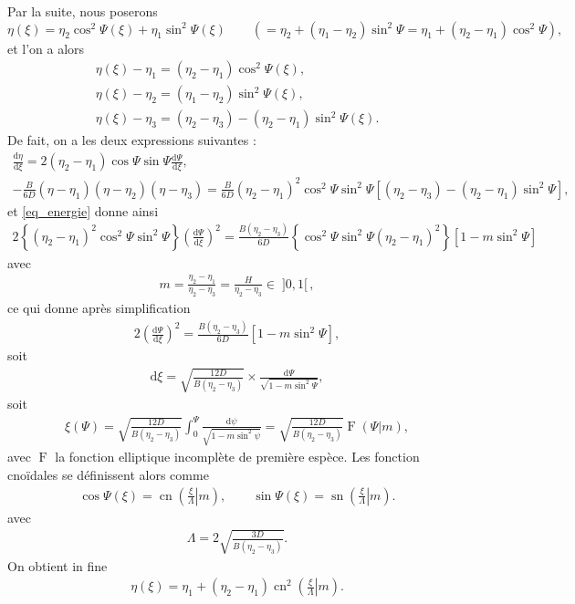 \documentclass[10pt,a4paper, oneside, fleqn]{myarticle}
\newcommand{\dd}{\mathrm{d}}
\DeclareMathOperator{\ellipF}{F}
\DeclareMathOperator{\cn}{cn}
\DeclareMathOperator{\sn}{sn}
\newcommand{\cnoidal}[2]{\cn\left(\left. #1\right\vert #2\right)}
\newcommand{\snoidal}[2]{\sn\left(\left. #1\right\vert #2\right)}
\begin{document}

Par la suite, nous poserons 
\begin{equation}
  \eta(\xi) = \eta_2 \cos^2\Psi(\xi) +  \eta_1 \sin^2\Psi(\xi) \qquad(=\eta_2 + (\eta_1-\eta_2)\sin^2\Psi=\eta_1+(\eta_2-\eta_1)\cos^2\Psi),
\end{equation}
et l'on a alors
\begin{gather}
  \eta(\xi)- \eta_1 = (\eta_2-\eta_1) \cos^2\Psi(\xi),\\
  \eta(\xi)- \eta_2 = (\eta_1-\eta_2) \sin^2\Psi(\xi),\\
  \eta(\xi)- \eta_3 = (\eta_2-\eta_3) - (\eta_2-\eta_1)\sin^2\Psi(\xi).
\end{gather}
De fait, on a les deux expressions suivantes :
\begin{gather}
  \frac{\dd \eta}{\dd \xi} =  2 (\eta_2-\eta_1)\cos\Psi\sin\Psi \frac{\dd \Psi}{\dd \xi},\\
  -\frac{B}{6D} (\eta - \eta_1) (\eta - \eta_2) (\eta - \eta_3) = \frac{B}{6D} (\eta_2-\eta_1)^2\cos^2\Psi\sin^2\Psi\left[(\eta_2-\eta_3) - (\eta_2-\eta_1)\sin^2\Psi\right],
\end{gather}
et \eqref{eq_energie} donne ainsi
\begin{gather}
  2 {\left\{\left(\eta_2-\eta_1\right)^2\cos^2\Psi\sin^2\Psi\right\}} \left(\frac{\dd \Psi}{\dd \xi}\right)^2 = \frac{B (\eta_2-\eta_3)}{6D}{\left\{\cos^2\Psi\sin^2\Psi (\eta_2-\eta_1)^2\right\}}\left[1 - m\sin^2\Psi\right]
\end{gather}
avec
\begin{gather}
  \boxed{m=\frac{\eta_2-\eta_1}{\eta_2-\eta_3}=\frac{H}{\eta_2-\eta_3} \in\; ]0,1[}\,,\label{expr_m}
\end{gather}
ce qui donne après simplification
\begin{gather}
  2 \left(\frac{\dd \Psi}{\dd \xi}\right)^2 = \frac{B (\eta_2-\eta_3)}{6D}\left[1 - m\sin^2\Psi\right],
\end{gather}
soit
\begin{gather}
  \dd \xi = \sqrt{\frac{12D}{B (\eta_2-\eta_3)}}\times \frac{\dd \Psi}{\sqrt{1 - m\sin^2\Psi}},
\end{gather}
soit
\begin{gather}
   \xi(\Psi) = \sqrt{\frac{12D}{B (\eta_2-\eta_3)}} \int_0^{\Psi}\frac{\dd \psi}{\sqrt{1 - m\sin^2\psi}}=\sqrt{\frac{12D}{B (\eta_2-\eta_3)}} \ellipF(\Psi\vert m),
\end{gather}
avec $\ellipF$ la fonction elliptique incomplète de première espèce. Les fonction cnoïdales se définissent alors comme
\begin{gather}
  \cos \Psi(\xi) = \cnoidal {\frac{\xi}{\Lambda}}{m},
  \qquad
  \sin \Psi(\xi) = \snoidal {\frac{\xi}{\Lambda}}{m}.
\end{gather}
avec
\begin{gather}
  \Lambda = 2\sqrt{\frac{3D}{B (\eta_2-\eta_3)}}. \label{def_Lambda}
\end{gather}
On obtient in fine
\begin{gather}
  \eta(\xi) = \eta_1 + (\eta_2-\eta_1) \cn^2 \left(\left. \frac{\xi}{\Lambda} \right\vert m\right).
\end{gather}
\end{document}
